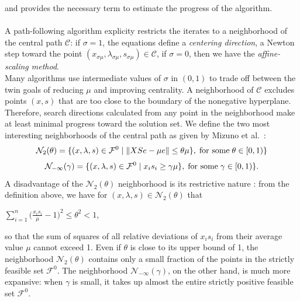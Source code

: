 \documentclass[a4paper,10 pt,titlepage,twoside]{book}
\theoremstyle{plain}
\theoremstyle{definition}
\theoremstyle{remark}
\begin{document}
 and provides the necessary term to estimate the progress of the
 algorithm.\\  
 \\
 A path-following algorithm explicity restricts the iterates to a neighborhood of the central path $\mathcal{C}$: if $\sigma = 1$, the equations define a \textit{centering direction}, a Newton step toward the point $(x_{\sigma\mu},\lambda_{\sigma\mu}, s_{\sigma\mu})\in\mathcal{C}$, if $\sigma = 0$, then we have the \textit{affine-scaling method}.\\  
 Many algorithms use intermediate values of $\sigma$ in $(0,1)$ to trade off between the twin goals of reducing $\mu$ and improving centrality. A neighborhood of $\mathcal{C}$ excludes points $(x, s) $ that are too close to the boundary of the nonegative hyperplane. Therefore, search directions calculated from any point in the neighborhood make at least minimal progress toward the solution set.
 We define the two most interesting neighborhoods of the central path as given
by Mizuno et al.~\cite{5}:\\
\begin{equation*}
\mathcal{N}_{2}(\theta) =\{(x, \lambda,s)\in\mathcal{F}^{0} \;|\;\lVert XSe - \mu e \rVert \leq \theta \mu \}, \text{\;for some\;} \theta \in [0,1)\}
\end{equation*} 
\begin{equation*}
\mathcal{N}_{-\infty}(\gamma) =\{ (x, \lambda,s)\in\mathcal{F}^{0} \;|\; x_{i}s_{i} \geq \gamma \mu \}, \text{\;for some\;} \gamma \in [0,1)\}.
\end{equation*} 
A disadvantage of the $\mathcal{N}_{2}(\theta)$ neighborhood is its restrictive nature \cite{W}: from the definition above, we have for $(x, \lambda,s)\in\mathcal{N}_{2}(\theta)$ that
\begin{center}
	$\sum\limits_{i=1}^{n}\big(\frac{x_{i}s_{i}}{\mu}-1\big)^{2}\leq \theta^{2}<1$,
\end{center} 
so that the sum of squares of all relative deviations of $x_{i}s_{i}$ from their average value $\mu$ cannot exceed 1. Even if $\theta$ is close to its upper bound of 1, the neighborhood $\mathcal{N}_{2}(\theta)$ contains only a small fraction of the points in the strictly feasible set $\mathcal{F}^{0}$. The neighborhood $\mathcal{N}_{-\infty}(\gamma)$, on the other hand, is much more expansive: when $\gamma$ is small, it takes up almost the entire strictly positive feasible set $\mathcal{F}^{0}$. 
\end{document}
